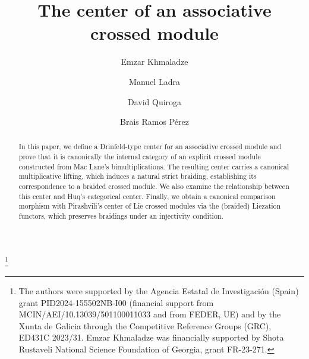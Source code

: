 \documentclass[12pt,reqno]{amsart}
\theoremstyle{plain}
\theoremstyle{definition}
\theoremstyle{remark}
\numberwithin{equation}{section}
\begin{document}
\title[The center of an associative crossed module]{The center of an associative crossed module}


\author[E. Khmaladze]{Emzar Khmaladze}
\address{\footnotesize The University of Georgia, Kostava St. 77a, Tbilisi 0171
	Georgia \& A. Razmadze Mathematical Institute of Tbilisi State University
	2, M. Aleksidze II Lane, Tbilisi 0193, Georgia}

\author[M. Ladra]{Manuel Ladra}
\address{\footnotesize Department of Mathematics \& CITMAga, Universidade de Santiago de Compostela, 15782 Santiago de Compostela, Spain}

\author[D. Quiroga]{David Quiroga}
\address{\footnotesize Department of Mathematics, Universidade de Santiago de Compostela, 15782 Santiago de Compostela, Spain}

\author[B. Ramos P\'erez]{Brais Ramos P\'erez}
\address{\footnotesize Department of Mathematics \& CITMAga, Universidade de Santiago de Compostela, 15782 Santiago de Compostela, Spain}




\thanks{The authors were supported by the Agencia Estatal de Investigaci\'on (Spain)  grant PID2024-155502NB-I00 (financial support from MCIN/AEI/10.13039/501100011033 and from FEDER,
	UE)  and by the Xunta de Galicia through the Competitive Reference Groups (GRC), ED431C
	2023/31. Emzar Khmaladze was financially supported  by Shota Rustaveli National Science
	Foundation of Georgia, grant FR-23-271.}
	
\begin{abstract}
In this paper, we define a Drinfeld-type center for an associative crossed module and prove that it is canonically the internal category of an explicit crossed module constructed from Mac Lane’s bimultiplications. The resulting center carries a canonical multiplicative lifting, which induces a natural strict braiding, establishing its correspondence to a braided crossed module. We also examine the relationship between this center and Huq’s categorical center. Finally, we obtain a canonical comparison morphism with Pirashvili’s center of Lie crossed modules via the (braided) Liezation functors, which preserves braidings under an injectivity condition.
\end{abstract}
\end{document}
